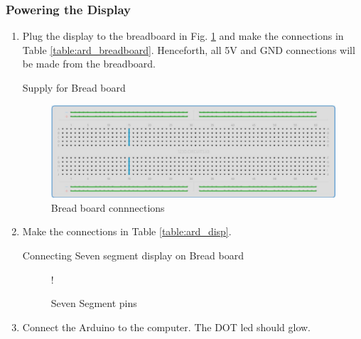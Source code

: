 \subsubsection{Powering the Display}
\begin{enumerate}[label=\arabic*.,ref=\theenumi]

\item
	Plug the display to the breadboard in Fig. \ref{fig:breadboard} and make the connections in Table \ref{table:ard_breadboard}.  Henceforth, all 5V and GND connections will be made from the breadboard.

\begin{table}[H]
\centering

\caption{Supply for Bread board}
\label{table:ard_breadboard}
\end{table}

\begin{figure}[H]
\begin{center}
\includegraphics[width=0.75\columnwidth]{ide/sevenseg/figs/breadboard}
\end{center}
\caption{Bread board connnections}
\label{fig:breadboard}
\end{figure}


%

\item
Make the  connections in Table \ref{table:ard_disp}.  
%
\begin{table}[H]
\centering

\caption{Connecting Seven segment display on Bread board}
\label{table:ard_disp}
\end{table}

%
%
\begin{figure}[H]
\begin{center}
 {!} {

}
\end{center}
\caption{Seven Segment pins}
\label{fig:sevenseg}
\end{figure}

%
\item
	Connect the Arduino to the computer. The DOT led should glow.
\end{enumerate}
